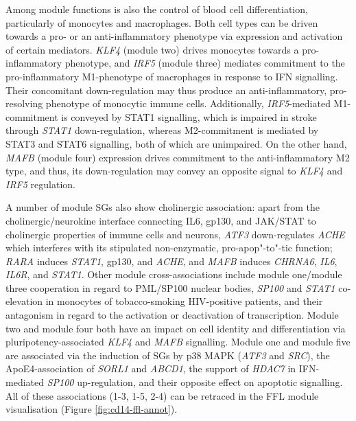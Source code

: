 Among module functions is also the control of blood cell differentiation, particularly of monocytes and macrophages. Both cell types can be driven towards a pro- or an anti-inflammatory phenotype via expression and activation of certain mediators. \emph{KLF4} (module two) drives monocytes towards a pro-inflammatory phenotype, and \emph{IRF5} (module three) mediates commitment to the pro-inflammatory M1-phenotype of macrophages in response to IFN signalling. Their concomitant down-regulation may thus produce an anti-inflammatory, pro-resolving phenotype of monocytic immune cells. Additionally, \emph{IRF5}-mediated M1-commitment is conveyed by STAT1 signalling, which is impaired in stroke through \emph{STAT1} down-regulation, whereas M2-commitment is mediated by STAT3 and STAT6 signalling, both of which are unimpaired. On the other hand, \emph{MAFB} (module four) expression drives commitment to the anti-inflammatory M2 type, and thus, its down-regulation may convey an opposite signal to \emph{KLF4} and \emph{IRF5} regulation. 

A number of module SGs also show cholinergic association: apart from the cholinergic/neurokine interface connecting IL6, gp130, and JAK/STAT to cholinergic properties of immune cells and neurons,\cite{Lobentanzer2019a} \emph{ATF3} down-regulates \emph{ACHE} which interferes with its stipulated non-enzymatic, pro-apop"-to"-tic function; \emph{RARA} induces \emph{STAT1}, gp130, and \emph{ACHE}, and \emph{MAFB} induces \emph{CHRNA6}, \emph{IL6}, \emph{IL6R}, and \emph{STAT1}. Other module cross-associations include module one/module three cooperation in regard to PML/SP100 nuclear bodies, \emph{SP100} and \emph{STAT1} co-elevation in monocytes of tobacco-smoking HIV-positive patients, and their antagonism in regard to the activation or deactivation of transcription. Module two and module four both have an impact on cell identity and differentiation via pluripotency-associated \emph{KLF4} and \emph{MAFB} signalling. Module one and module five are associated via the induction of SGs by p38 MAPK (\emph{ATF3} and \emph{SRC}), the ApoE4-association of \emph{SORL1} and \emph{ABCD1}, the support of \emph{HDAC7} in IFN-mediated \emph{SP100} up-regulation, and their opposite effect on apoptotic signalling. All of these associations (1-3, 1-5, 2-4) can be retraced in the FFL module visualisation (Figure \ref{fig:cd14-ffl-annot}).


